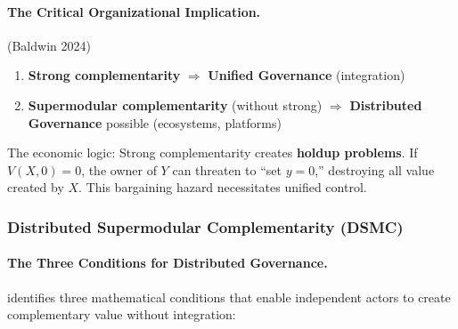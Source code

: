 \paragraph{The Critical Organizational Implication.}

\begin{theorem}
\label{thm:governance}
\textup{(Baldwin 2024)}
\begin{enumerate}
    \item \textbf{Strong complementarity} $\Rightarrow$ \textbf{Unified Governance} (integration)
    \item \textbf{Supermodular complementarity} (without strong) $\Rightarrow$ 
    \textbf{Distributed Governance} possible (ecosystems, platforms)
\end{enumerate}
\end{theorem}

The economic logic: Strong complementarity creates \textbf{holdup problems}. If 
$V(X, 0) = 0$, the owner of $Y$ can threaten to ``set $y = 0$,'' destroying all 
value created by $X$. This bargaining hazard necessitates unified control.

\subsubsection{Distributed Supermodular Complementarity (DSMC)}

\paragraph{The Three Conditions for Distributed Governance.}

\citet{baldwin2024design} identifies three mathematical conditions that enable 
independent actors to create complementary value without integration:

